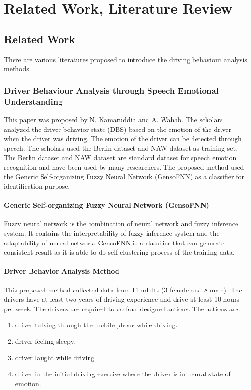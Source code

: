 \chapter{Related Work, Literature Review}
\section{Related Work}
There are various literatures proposed to introduce the driving behaviour analysis methods.
\subsection{Driver Behaviour Analysis through Speech Emotional Understanding}
This paper was proposed by N. Kamaruddin and A. Wahab. The scholars analyzed the driver behavior state (DBS) based on the emotion of the driver when the driver was driving. The emotion of the driver can be detected through speech. 
The scholars used the Berlin dataset and NAW dataset as training set. The Berlin dataset and NAW dataset are standard dataset for speech emotion recognition and have been used by many researchers.
The proposed method used the Generic Self-organizing Fuzzy Neural Network (GensoFNN) as a classifier for identification purpose. 
\subsubsection{Generic Self-organizing Fuzzy Neural Network (GensoFNN)}
Fuzzy neural network is the combination of neural network and fuzzy inference system. It contains the interpretability of fuzzy inference system and the adaptability of neural network. GensoFNN is a classifier that can generate consistent result as it is able to do self-clustering process of the training data.
\subsubsection{Driver Behavior Analysis Method}
This proposed method collected data from 11 adults (3 female and 8 male). The drivers have at least two years of driving experience and drive at least 10 hours per week. The drivers are required to do four designed actions. The actions are: 
\begin{enumerate}
\item driver talking through the mobile phone while driving.
\item driver feeling sleepy.
\item driver laught while driving
\item driver in the initial driving exercise where the driver is in neural state of emotion.
\end{enumerate}

